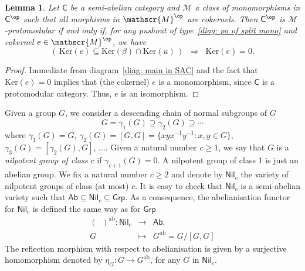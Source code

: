 \documentclass[10pt,a4paper]{amsart}
\theoremstyle{plain}
\newtheorem{lemma}[subsection]{Lemma}
\theoremstyle{definition}
\theoremstyle{remark}
\newcommand{\defn}[1]{\emph{#1}}
\newcommand{\To}{\Rightarrow}
\newcommand{\C}{\ensuremath{\mathsf{C}}}
\newcommand{\Grp}{\ensuremath{\mathsf{Grp}}}
\newcommand{\Ab}{\ensuremath{\mathsf{Ab}}}
\newcommand{\Nil}{\ensuremath{\mathsf{Nil}}}
\newcommand{\M}{\ensuremath{\mathscr{M}}}
\newcommand{\Ker}{\ensuremath{\mathrm{Ker}}}
\newcommand{\ab}{\ensuremath{\mathrm{ab}}}
\begin{document}
\begin{lemma}\label{lem: M-proto for Nil_c} Let $\C$ be a semi-abelian category and $\M$ a class of monomorphisms in $\C^\op$ such that all morphisms in $\M^\op$ are cokernels. Then $\C^\op$ is $\M$-protomodular if and only if, for any pushout of type~\eqref{diag: po of split mono} and cokernel $e\in \M^\op$, we have
\begin{equation}\label{diag: M-proto in C^op with kernels}
 \left(\, \Ker(e) \subseteq \Ker(\beta)\cap \Ker(u) \,\right) \;\;\To\;\; \Ker(e)=0.
\end{equation}
\end{lemma}
\begin{proof} Immediate from diagram~\eqref{diag: main in SAC} and the fact that $\Ker(e)=0$ implies that (the cokernel) $e$ is a monomorphism, since $\C$ is a protomodular category. Thus, $e$ is an isomorphism.
\end{proof}

Given a group $G$, we consider a descending chain of normal subgroups of $G$
\[
	G= \gamma_1(G) \supseteq \gamma_2(G) \supseteq \cdots
\]
where $\gamma_1(G)=G$, $\gamma_2(G)=[G,G]=\{xyx^{-1}y^{-1}: x,y\in G\}$, $\gamma_3(G)=[\gamma_2(G),G]$, $\dots$. Given a natural number $c\ge 1$, we say that $G$ is a \defn{nilpotent group of class $c$} if $\gamma_{c+1}(G)=0$. A nilpotent group of class 1 is just an abelian group. We fix a natural number $c\ge 2$ and denote by $\Nil_c$ the variety of nilpotent groups of class (at most) $c$. It is easy to check that $\Nil_c$ is a semi-abelian variety such that $\Ab\subseteq \Nil_c\subseteq \Grp$. As a consequence, the abelianisation functor for $\Nil_c$ is defined the same way as for $\Grp$
\[
	\begin{array}{rcl}
		(\;\;)^{\ab}: \Nil_c & \longrightarrow & \Ab. \\
		G & \longmapsto & G^\ab=G/[G,G]
	\end{array}
\]
The reflection morphism with respect to abelianisation is given by a surjective homomorphism denoted by $\eta_G\colon G\rightarrow G^\ab$, for any $G$ in $\Nil_c$.
\end{document}

